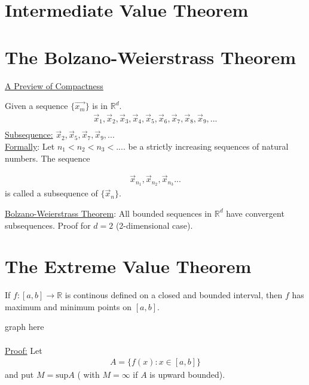 \documentclass[12pt,letterpaper]{article}
\begin{document}
\section*{Intermediate Value Theorem}






\section*{The Bolzano-Weierstrass Theorem}
\uline{A Preview of Compactness}

Given a sequence $\{\vec{x_m}\}$ is in $\mathbb{R}^d$.
\begin{align*}
	\vec{x}_1, \vec{x}_2, \vec{x}_3, \vec{x}_4, \vec{x}_5, \vec{x}_6, \vec{x}_7, \vec{x}_8, \vec{x}_9, ... \\
\end{align*}
\uline{Subsequence:} $ \vec{x}_2, \vec{x}_5, \vec{x}_7, \vec{x}_9, ...$ \\

\uline{Formally}: Let $n_1<n_2<n_3<....$ be a strictly increasing sequences of natural numbers. The sequence

\begin{align*}
	\vec{x}_{n_1}, \vec{x}_{n_2}, \vec{x}_{n_3}...
\end{align*}
is called a subsequence of $\{\vec{x}_n \}$.



\uline{Bolzano-Weierstrass Theorem}: All bounded sequences in $\mathbb{R}^d$ have convergent subsequences. 
Proof for $d=2$ (2-dimensional case). 




\section*{The Extreme Value Theorem}
If $f:[a,b]\to\mathbb{R}$ is continous defined on a closed and bounded interval, then $f$ has maximum and minimum points on $[a,b]$.

graph here \\
\\
\uline{Proof:} Let
\begin{align*}
	A = \{ f(x) : x\in[a,b]\}
\end{align*}
and put $M = \text{sup} A$ ( with $M=\infty$ if $A$ is upward bounded). \\
\end{document}
